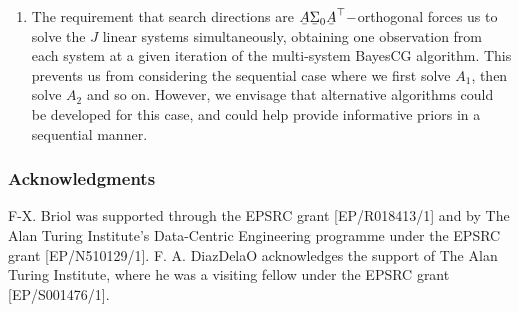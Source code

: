 \documentclass[twoside]{article}
\newcommand\barbelow[1]{\stackunder[1.2pt]{$#1$}{\rule{.8ex}{.075ex}}}
\begin{document}
\begin{enumerate}
	\item The requirement that search directions are $\barbelow{A} \barbelow{\Sigma}_0 \barbelow{A}^\top-$orthogonal forces us to solve the $J$ linear systems simultaneously, obtaining one observation from each system at a given iteration of the multi-system BayesCG algorithm. This prevents us from considering the sequential case where we first solve $A_1$, then solve $A_2$ and so on. However, we envisage that alternative algorithms could be developed for this case, and could help provide informative priors in a sequential manner.

\end{enumerate}


\subsubsection*{Acknowledgments}

F-X. Briol was supported through the EPSRC grant [EP/R018413/1] and by The Alan Turing Institute's Data-Centric Engineering programme under the EPSRC grant [EP/N510129/1]. F. A. DiazDelaO acknowledges the support of The Alan Turing Institute, where he was a visiting fellow under the EPSRC grant [EP/S001476/1].

{

\small
\setlength{\bibsep}{0.5pt}



}
\end{document}
